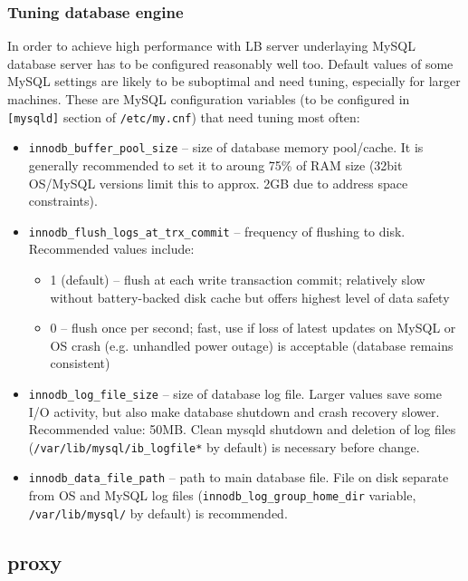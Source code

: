 \subsubsection{Tuning database engine}
\label{inst:db_tuning}

In order to achieve high performance with LB server underlaying MySQL 
database server has to be configured reasonably well too. 
Default values of some MySQL settings are likely to be suboptimal
and need tuning, especially for larger machines.
These are MySQL configuration variables (to be configured in \texttt{[mysqld]} 
section of \texttt{/etc/my.cnf}) that need tuning most often:
\begin{itemize}
\item \texttt{innodb\_buffer\_pool\_size} -- size of database memory pool/cache. 
It is generally recommended to set it to aroung 75\% of RAM size
(32bit OS/MySQL versions limit this to approx. 2GB due to address space 
constraints).

\item \texttt{innodb\_flush\_logs\_at\_trx\_commit} -- frequency of flushing to disk.
Recommended values include:
\begin{itemize}
\item 1 (default) -- flush at each write transaction commit; relatively
slow without battery-backed disk cache but offers highest level of data safety
\item 0 -- flush once per second; fast, use if loss of latest updates on MySQL
or OS crash (e.g. unhandled power outage) is acceptable (database remains consistent)
\end{itemize}

\item \texttt{innodb\_log\_file\_size} -- size of database log file. Larger values
save some I/O activity, but also make database shutdown and crash recovery slower.
Recommended value: 50MB. Clean mysqld shutdown and deletion of log files 
(\texttt{/var/lib/mysql/ib\_logfile*} by default) is necessary before change.

\item \texttt{innodb\_data\_file\_path} -- path to main database file. File on
disk separate from OS and MySQL log files (\texttt{innodb\_log\_group\_home\_dir} variable,
\texttt{/var/lib/mysql/} by default) is recommended.

\end{itemize}

\subsection{\LB proxy}

